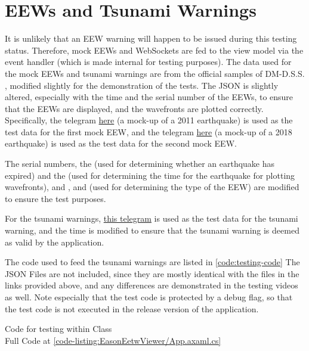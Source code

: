 \section{EEWs and Tsunami Warnings}

It is unlikely that an EEW warning will happen to be issued during this testing status. Therefore, mock EEWs and WebSockets are fed to the view model via the event handler (which is made internal for testing purposes). The data used for the mock EEWs and tsunami warnings are from the official samples of DM-D.S.S. \autocite{dmdata-sample}, modified slightly for the demonstration of the tests. The JSON is slightly altered, especially with the time and the serial number of the EEWs, to ensure that the EEWs are displayed, and the wavefronts are plotted correctly. Specifically, the telegram \href{https://sample.dmdata.jp/conversion/json/schema/eew-information/vxse45_rjtd_20110311144810.json}{here} (a mock-up of a 2011 earthquake) is used as the test data for the first mock EEW, and the telegram \href{https://sample.dmdata.jp/conversion/json/schema/eew-information/vxse44_rjtd_20180906031016.json}{here} (a mock-up of a 2018 earthquake) is used as the test data for the second mock EEW.

The serial numbers, the  (used for determining whether an earthquake has expired) and the  (used for determining the time for the earthquake for plotting wavefronts), and ,  and  (used for determining the type of the EEW) are modified to ensure the test purposes.

For the tsunami warnings, \href{https://sample.dmdata.jp/conversion/json/schema/tsunami-information/vtse41_jpos_20110311144959.json}{this telegram} is used as the test data for the tsunami warning, and the time is modified to ensure that the tsunami warning is deemed as valid by the application.

The code used to feed the tsunami warnings are listed in \autoref{code:testing-code} The JSON Files are not included, since they are mostly identical with the files in the links provided above, and any differences are demonstrated in the testing videos as well. Note especially that the test code is protected by a debug flag, so that the test code is not executed in the release version of the application.

\begin{normallisting}
    \caption[Code for testing within  Class]{
        Code for testing within  Class \\
        Full Code at \autoref{code-listing:EasonEetwViewer/App.axaml.cs}}
    \label{code:testing-code}
\end{normallisting}

